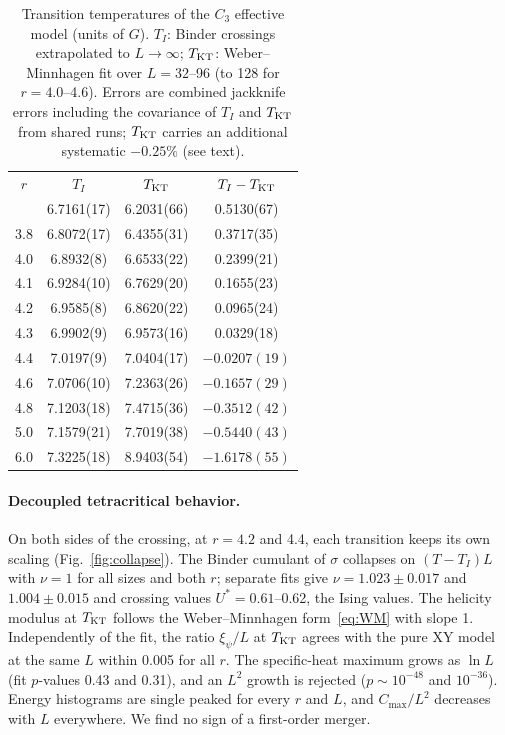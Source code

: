 \documentclass[pre,reprint,superscriptaddress,longbibliography,amsmath,amssymb,floatfix]{revtex4-2}
\begin{document}
\begin{table}[!tbp]
\caption{Transition temperatures of the $C_3$ effective model (units of $G$). $T_I$: Binder crossings extrapolated to $L\to\infty$; $T_{\rm KT}$: Weber--Minnhagen fit over $L=32$--96 (to 128 for $r=4.0$--4.6). Errors are combined jackknife errors including the covariance of $T_I$ and $T_{\rm KT}$ from shared runs; $T_{\rm KT}$ carries an additional systematic $-0.25\%$ (see text).}
\label{tab:TT}
\begin{ruledtabular}
\begin{tabular}{cccc}
$r$ & $T_I$ & $T_{\rm KT}$ & $T_I-T_{\rm KT}$\\
\colrule
3.6 & 6.7161(17) & 6.2031(66) & 0.5130(67)\\
3.8 & 6.8072(17) & 6.4355(31) & 0.3717(35)\\
4.0 & 6.8932(8)  & 6.6533(22) & 0.2399(21)\\
4.1 & 6.9284(10) & 6.7629(20) & 0.1655(23)\\
4.2 & 6.9585(8)  & 6.8620(22) & 0.0965(24)\\
4.3 & 6.9902(9)  & 6.9573(16) & 0.0329(18)\\
4.4 & 7.0197(9)  & 7.0404(17) & $-0.0207(19)$\\
4.6 & 7.0706(10) & 7.2363(26) & $-0.1657(29)$\\
4.8 & 7.1203(18) & 7.4715(36) & $-0.3512(42)$\\
5.0 & 7.1579(21) & 7.7019(38) & $-0.5440(43)$\\
6.0 & 7.3225(18) & 8.9403(54) & $-1.6178(55)$\\
\end{tabular}
\end{ruledtabular}
\end{table}

\paragraph*{Decoupled tetracritical behavior.} On both sides of the crossing, at $r=4.2$ and 4.4, each transition keeps its own scaling (Fig.~\ref{fig:collapse}). The Binder cumulant of $\sigma$ collapses on $(T-T_I)L$ with $\nu=1$ for all sizes and both $r$; separate fits give $\nu=1.023\pm0.017$ and $1.004\pm0.015$ and crossing values $U^*=0.61$--0.62, the Ising values. The helicity modulus at $T_{\rm KT}$ follows the Weber--Minnhagen form~\eqref{eq:WM} with slope 1. Independently of the fit, the ratio $\xi_\psi/L$ at $T_{\rm KT}$ agrees with the pure XY model at the same $L$ within 0.005 for all $r$. The specific-heat maximum grows as $\ln L$ (fit $p$-values 0.43 and 0.31), and an $L^2$ growth is rejected ($p\sim10^{-48}$ and $10^{-36}$). Energy histograms are single peaked for every $r$ and $L$, and $C_{\max}/L^2$ decreases with $L$ everywhere. We find no sign of a first-order merger.
\end{document}
